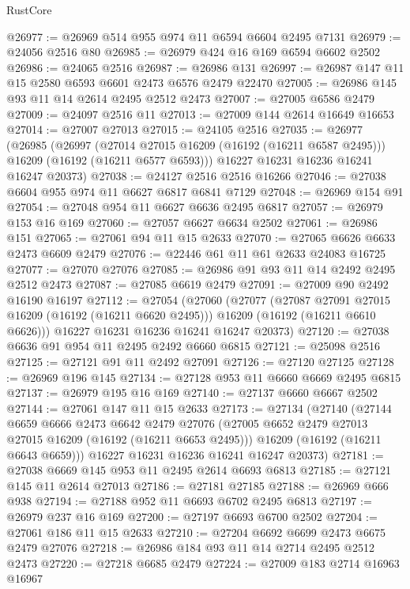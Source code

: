 \begin{lexlean}{RustCore}
\begin{coremodule}
@26977 := @26969 @514 @955 @974 @11 @6594 @6604 @2495 @7131
@26979 := @24056 @2516 @80
@26985 := @26979 @424 @16 @169 @6594 @6602 @2502
@26986 := @24065 @2516
@26987 := @26986 @131
@26997 := @26987 @147 @11 @15 @2580 @6593 @6601 @2473 @6576 @2479 @22470
@27005 := @26986 @145 @93 @11 @14 @2614 @2495 @2512 @2473
@27007 := @27005 @6586 @2479
@27009 := @24097 @2516 @11
@27013 := @27009 @144 @2614 @16649 @16653
@27014 := @27007 @27013
@27015 := @24105 @2516
@27035 := @26977
    (@26985
      (@26997
        (@27014 @27015 @16209 (@16192 (@16211 @6587 @2495)))
        @16209
        (@16192 (@16211 @6577 @6593)))
      @16227
      @16231
      @16236
      @16241
      @16247
      @20373)
@27038 := @24127 @2516 @2516 @16266
@27046 := @27038 @6604 @955 @974 @11 @6627 @6817 @6841 @7129
@27048 := @26969 @154 @91
@27054 := @27048 @954 @11 @6627 @6636 @2495 @6817
@27057 := @26979 @153 @16 @169
@27060 := @27057 @6627 @6634 @2502
@27061 := @26986 @151
@27065 := @27061 @94 @11 @15 @2633
@27070 := @27065 @6626 @6633 @2473 @6609 @2479
@27076 := @22446 @61 @11 @61 @2633 @24083 @16725
@27077 := @27070 @27076
@27085 := @26986 @91 @93 @11 @14 @2492 @2495 @2512 @2473
@27087 := @27085 @6619 @2479
@27091 := @27009 @90 @2492 @16190 @16197
@27112 := @27054
    (@27060
      (@27077
        (@27087 @27091 @27015 @16209 (@16192 (@16211 @6620 @2495)))
        @16209
        (@16192 (@16211 @6610 @6626)))
      @16227
      @16231
      @16236
      @16241
      @16247
      @20373)
@27120 := @27038 @6636 @91 @954 @11 @2495 @2492 @6660 @6815
@27121 := @25098 @2516
@27125 := @27121 @91 @11 @2492 @27091
@27126 := @27120 @27125
@27128 := @26969 @196 @145
@27134 := @27128 @953 @11 @6660 @6669 @2495 @6815
@27137 := @26979 @195 @16 @169
@27140 := @27137 @6660 @6667 @2502
@27144 := @27061 @147 @11 @15 @2633
@27173 := @27134
    (@27140
      (@27144
        @6659
        @6666
        @2473
        @6642
        @2479
        @27076
        (@27005 @6652 @2479 @27013 @27015 @16209 (@16192 (@16211 @6653 @2495)))
        @16209
        (@16192 (@16211 @6643 @6659)))
      @16227
      @16231
      @16236
      @16241
      @16247
      @20373)
@27181 := @27038 @6669 @145 @953 @11 @2495 @2614 @6693 @6813
@27185 := @27121 @145 @11 @2614 @27013
@27186 := @27181 @27185
@27188 := @26969 @666 @938
@27194 := @27188 @952 @11 @6693 @6702 @2495 @6813
@27197 := @26979 @237 @16 @169
@27200 := @27197 @6693 @6700 @2502
@27204 := @27061 @186 @11 @15 @2633
@27210 := @27204 @6692 @6699 @2473 @6675 @2479 @27076
@27218 := @26986 @184 @93 @11 @14 @2714 @2495 @2512 @2473
@27220 := @27218 @6685 @2479
@27224 := @27009 @183 @2714 @16963 @16967

\end{coremodule}
\end{lexlean}
